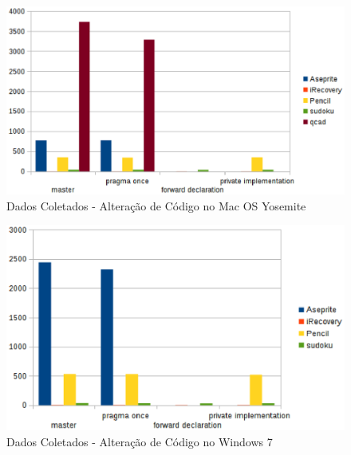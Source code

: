 \begin{figure}[b]
    \centering
        \includegraphics{figuras/graficos/mac_os_alteracao_codigo.eps}
    \caption{Dados Coletados - Alteração de Código no Mac OS Yosemite}
    \label{benchmark_guardas_de_inclusao}
\end{figure}

\begin{figure}[b]
    \centering
        \includegraphics{figuras/graficos/windows_alteracao_codigo.eps}
    \caption{Dados Coletados - Alteração de Código no Windows 7}
    \label{benchmark_guardas_de_inclusao}
\end{figure}


